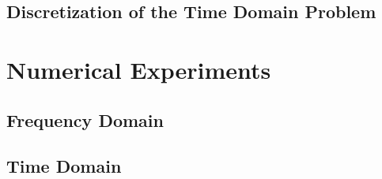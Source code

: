 \subsection{Discretization of the Time Domain Problem}
\section{Numerical Experiments}
\subsection{Frequency Domain}
\subsection{Time Domain}
